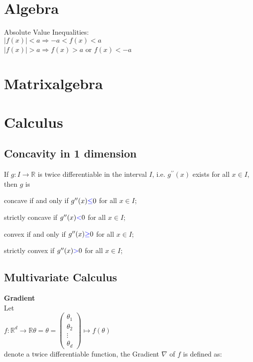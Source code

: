 \section{Algebra}
Absolute Value Inequalities:\\
$ |f(x)| < a  \Rightarrow  -a < f(x) < a$\\ 
$|f(x)| > a  \Rightarrow f(x) > a$ or $f(x) < -a$\\
\section{Matrixalgebra}
\section{Calculus}
\subsection*{Concavity in 1 dimension}
If $g:I \to \mathbb {R}$ is twice differentiable in the interval $I$, i.e. $g^{\prime \prime }(x)$ exists for all $x \in I$, then $g$  is

concave if and only if $g^{\prime \prime }(x) {\color{blue}{\leq }}  0$ for all $x \in I$;

strictly concave if $g^{\prime \prime }(x) {\color{blue}{<}}  0$ for all $x \in I$;

convex if and only if $g^{\prime \prime }(x) {\color{blue}{\geq }}  0$ for all $x \in I$;

strictly convex if $g^{\prime \prime }(x) {\color{blue}{>}}  0$ for all $x \in I$;

\subsection*{Multivariate Calculus}
\textbf{Gradient}\\
Let\\
$f: \mathbb {R}^ d \longrightarrow \mathbb {R} \theta = \displaystyle \theta =\begin{pmatrix} \theta _1\\ \theta _2\\ \vdots \\ \theta _ d\end{pmatrix} \displaystyle \mapsto \displaystyle f(\theta )$\\
denote a twice differentiable function, the Gradient $\nabla$ of $f$ is defined as:

